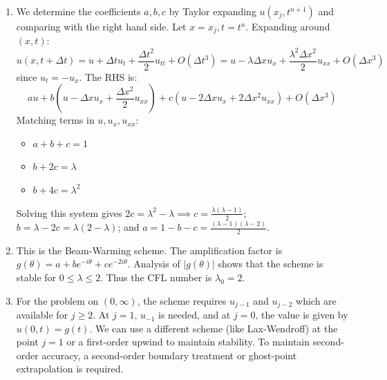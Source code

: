 \begin{solution}
\begin{enumerate}
    \item We determine the coefficients $a, b, c$ by Taylor expanding $u(x_j, t^{n+1})$ and comparing with the right hand side.
    Let $x = x_j, t = t^n$. Expanding around $(x, t)$:
    \[ u(x, t+\Delta t) = u + \Delta t u_t + \frac{\Delta t^2}{2} u_{tt} + O(\Delta t^3) = u - \lambda \Delta x u_x + \frac{\lambda^2 \Delta x^2}{2} u_{xx} + O(\Delta x^3) \]
    since $u_t = -u_x$. The RHS is:
    \[ a u + b(u - \Delta x u_x + \frac{\Delta x^2}{2} u_{xx}) + c(u - 2\Delta x u_x + 2\Delta x^2 u_{xx}) + O(\Delta x^3) \]
    Matching terms in $u, u_x, u_{xx}$:
    \begin{itemize}
        \item $a+b+c = 1$
        \item $b+2c = \lambda$
        \item $b+4c = \lambda^2$
    \end{itemize}
    Solving this system gives $2c = \lambda^2 - \lambda \implies c = \frac{\lambda(\lambda-1)}{2}$; $b = \lambda - 2c = \lambda(2-\lambda)$; and $a = 1 - b - c = \frac{(\lambda-1)(\lambda-2)}{2}$.
    \item This is the Beam-Warming scheme. The amplification factor is $g(\theta) = a + b e^{-i\theta} + c e^{-2i\theta}$. Analysis of $|g(\theta)|$ shows that the scheme is stable for $0 \leq \lambda \leq 2$. Thus the CFL number is $\lambda_0 = 2$.
    \item For the problem on $(0, \infty)$, the scheme requires $u_{j-1}$ and $u_{j-2}$ which are available for $j \ge 2$. At $j=1$, $u_{-1}$ is needed, and at $j=0$, the value is given by $u(0, t) = g(t)$. We can use a different scheme (like Lax-Wendroff) at the point $j=1$ or a first-order upwind to maintain stability. To maintain second-order accuracy, a second-order boundary treatment or ghost-point extrapolation is required.
\end{enumerate}
\end{solution}


